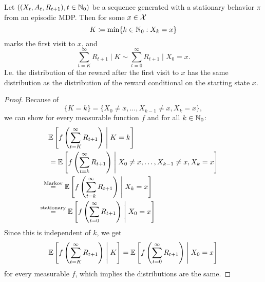 \begin{lemma}\label{appx8}
    Let \(((X_t,A_t,R_{t+1}),t\in\mathbb{N}_0)\) be a sequence generated with a stationary behavior \(\pi\) from an episodic MDP. Then for some \(x\in\mathcal{X}\)
    \[
        K\coloneqq\min\{k\in\mathbb{N}_0:X_k=x\}
    \]
    marks the first visit to \(x\), and
    \[
        \sum_{t=K}^\infty R_{t+1}\;\Big|\; K \sim \sum_{t=0}^\infty R_{t+1} \;\Big|\; X_0=x.
    \]
    I.e. the distribution of the reward after the first visit to \(x\) has the same distribution as the distribution of the reward conditional on the starting state \(x\). 
\end{lemma}
\begin{proof}
    Because of
    \[
        \{K=k\}=\{ X_0\neq x, \dots, X_{k-1}\neq x, X_k=x\},
    \]
    we can show for every measurable function \(f\) and for all \(k\in\mathbb{N}_0\):
    \begin{align*}
        &\E\left[f\left(\sum_{t=K}^\infty R_{t+1}\right)\;\middle|\; K=k\right]\\
        &=\E\left[f\left(\sum_{t=k}^\infty R_{t+1}\right)\;\middle|\; X_0\neq x, \dots, X_{k-1}\neq x, X_k=x\right]\\
        &\lxeq{\text{Markov}} \E\left[f\left(\sum_{t=k}^\infty R_{t+1}\right)\;\middle|\; X_k=x\right]\\
        &\lxeq{\text{stationary}} \E\left[f\left(\sum_{t=0}^\infty R_{t+1}\right)\;\middle|\; X_0=x\right]
    \end{align*}
    Since this is independent of \(k\), we get
    \begin{align*}
        \mathbb{E}\left[f\left(\sum_{t=K}^\infty R_{t+1}\right)\;\middle|\; K\right]
        =\mathbb{E}\left[f\left(\sum_{t=0}^\infty R_{t+1}\right)\;\middle|\; X_0=x\right]
    \end{align*}
    for every measurable \(f\), which implies the distributions are the same.
\end{proof}

